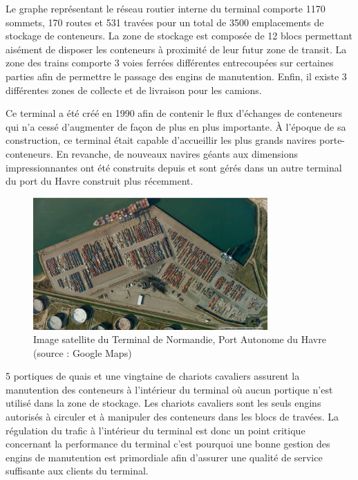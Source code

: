 Le graphe représentant le réseau routier interne du terminal comporte 1170 sommets, 170 routes et 531 travées pour un total de 3500 emplacements de stockage de conteneurs. La zone de stockage est composée de 12 blocs permettant aisément de disposer les conteneurs à proximité de leur futur zone de transit. La zone des trains comporte 3 voies ferrées différentes entrecoupées sur certaines parties afin de permettre le passage des engins de manutention. Enfin, il existe 3 différentes zones de collecte et de livraison pour les camions.

Ce terminal a été créé en 1990 afin de contenir le flux d'échanges de conteneurs qui n'a cessé d'augmenter de façon de plus en plus importante. À l'époque de sa construction, ce terminal était capable d'accueillir les plus grands navires porte-conteneurs. En revanche, de nouveaux navires géants aux dimensions impressionnantes ont été construits depuis et sont gérés dans un autre terminal du port du Havre construit plus récemment.

\begin{figure}[ht]
  \begin{center}
    \includegraphics[width=0.8\textwidth]{chapitres/application/terminalDeNormandieGoogleMaps.jpg}
    \caption{Image satellite du Terminal de Normandie, Port Autonome du Havre (source : Google Maps)}
    \label{fig:TNGoogle}
 \end{center}
\end{figure}

5 portiques de quais et une vingtaine de chariots cavaliers assurent la manutention des conteneurs à l'intérieur du terminal où aucun portique n'est utilisé dans la zone de stockage. Les chariots cavaliers sont les seuls engins autorisés à circuler et à manipuler des conteneurs dans les blocs de travées. La régulation du trafic à l'intérieur du terminal est donc un point critique concernant la performance du terminal c'est pourquoi une bonne gestion des engins de manutention est primordiale afin d'assurer une qualité de service suffisante aux clients du terminal.\\


